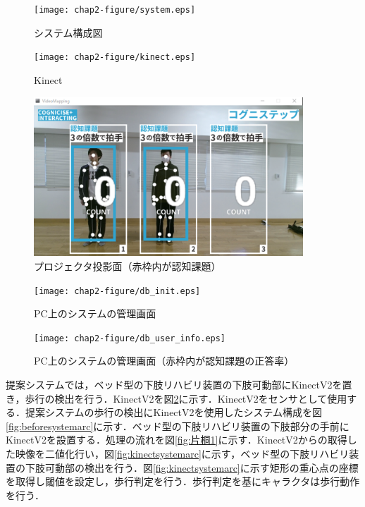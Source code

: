 \begin{figure}[tbp]
	\centering
			\texttt{[image: chap2-figure/system.eps]}
	\caption{システム構成図}
	\label{fig:system}
\end{figure}

\begin{figure}[tbp]
	\centering
			\texttt{[image: chap2-figure/kinect.eps]}
	\caption{Kinect}
	\label{fig:kinect}
\end{figure}
\fi

\begin{figure}[tbp]
	\centering
			\includegraphics[width=0.9\textwidth]{chap2-figure/vm_init.eps}
	\caption{プロジェクタ投影面（赤枠内が認知課題）}
	\label{fig:projection_surface}
\end{figure}

\begin{figure}[tbp]
	\centering
			\texttt{[image: chap2-figure/db\_init.eps]}
	\caption{PC上のシステムの管理画面}
	\label{fig:system_management}
\end{figure}

\begin{figure}[tbp]
	\centering
			\texttt{[image: chap2-figure/db\_user\_info.eps]}
	\caption{PC上のシステムの管理画面（赤枠内が認知課題の正答率）}
	\label{fig:check_answer_rate}
\end{figure}


提案システムでは，ベッド型の下肢リハビリ装置の下肢可動部にKinectV2\cite{KinectV2}を置き，歩行の検出を行う．KinectV2を図\ref{fig:kinect}に示す．KinectV2をセンサとして使用する．提案システムの歩行の検出にKinectV2を使用したシステム構成を図\ref{fig:beforesystemarc}に示す．ベッド型の下肢リハビリ装置の下肢部分の手前にKinectV2を設置する．処理の流れを図\ref{fig:片桐1}に示す．KinectV2からの取得した映像を二値化行い，図\ref{fig:kinectsystemarc}に示す，ベッド型の下肢リハビリ装置の下肢可動部の検出を行う．図\ref{fig:kinectsystemarc}に示す矩形の重心点の座標を取得し閾値を設定し，歩行判定を行う．歩行判定を基にキャラクタは歩行動作を行う．

